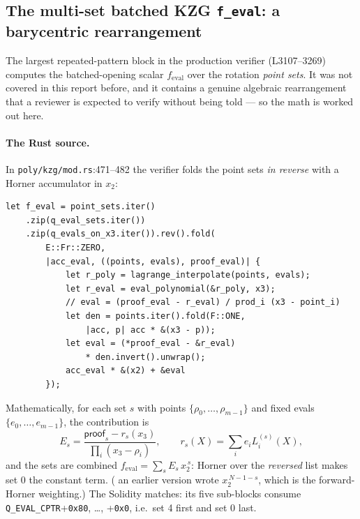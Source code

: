 \subsection{The multi-set batched KZG \texttt{f\_eval}: a barycentric rearrangement}
\label{sec:pr-feval-barycentric}

The largest repeated-pattern block in the production verifier
(L3107--3269) computes the batched-opening scalar
$f_\text{eval}$ over the rotation \emph{point sets}. It was not
covered in this report before, and it contains a genuine
algebraic rearrangement that a reviewer is expected to verify
without being told --- so the math is worked out here.

\paragraph{The Rust source.} In
\texttt{poly/kzg/mod.rs}:471--482 the verifier folds the point sets
\emph{in reverse} with a Horner accumulator in $x_2$:
\begin{lstlisting}[style=rust]
let f_eval = point_sets.iter()
    .zip(q_eval_sets.iter())
    .zip(q_evals_on_x3.iter()).rev().fold(
        E::Fr::ZERO,
        |acc_eval, ((points, evals), proof_eval)| {
            let r_poly = lagrange_interpolate(points, evals);
            let r_eval = eval_polynomial(&r_poly, x3);
            // eval = (proof_eval - r_eval) / prod_i (x3 - point_i)
            let den = points.iter().fold(F::ONE,
                |acc, p| acc * &(x3 - p));
            let eval = (*proof_eval - &r_eval)
                * den.invert().unwrap();
            acc_eval * &(x2) + &eval
        });
\end{lstlisting}
Mathematically, for each set $s$ with points
$\{\rho_0,\dots,\rho_{m-1}\}$ and fixed evals
$\{e_0,\dots,e_{m-1}\}$, the contribution is
\begin{equation}
E_s = \frac{\mathsf{proof}_s - r_s(x_3)}{\prod_i (x_3-\rho_i)},
\qquad
r_s(X)=\textstyle\sum_i e_i L_i^{(s)}(X),
\label{eq:pr-feval}
\end{equation}
and the sets are combined $f_\text{eval}=\sum_s E_s\,x_2^{\,s}$:
Horner over the \emph{reversed} list makes set $0$ the
constant term. ( an earlier version wrote
$x_2^{\,N-1-s}$, which is the forward-Horner weighting.) The
Solidity matches: its five sub-blocks consume
\texttt{Q\_EVAL\_CPTR}+\texttt{0x80}, \ldots, +\texttt{0x0}, i.e.\
set 4 first and set 0 last.

